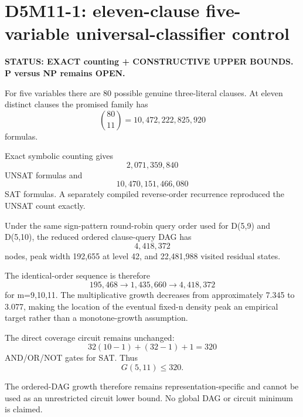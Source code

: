 \section*{D5M11-1: eleven-clause five-variable universal-classifier control}

\textbf{STATUS: EXACT counting + CONSTRUCTIVE UPPER BOUNDS. P versus NP remains OPEN.}

For five variables there are 80 possible genuine three-literal clauses. At
eleven distinct clauses the promised family has
\[
\binom{80}{11}=10{,}472{,}222{,}825{,}920
\]
formulas.

Exact symbolic counting gives
\[
\boxed{2{,}071{,}359{,}840}
\]
UNSAT formulas and
\[
10{,}470{,}151{,}466{,}080
\]
SAT formulas. A separately compiled reverse-order recurrence reproduced the
UNSAT count exactly.

Under the same sign-pattern round-robin query order used for D(5,9) and
D(5,10), the reduced ordered clause-query DAG has
\[
\boxed{4{,}418{,}372}
\]
nodes, peak width 192,655 at level 42, and 22,481,988 visited residual states.

The identical-order sequence is therefore
\[
195{,}468\to1{,}435{,}660\to4{,}418{,}372
\]
for m=9,10,11. The multiplicative growth decreases from approximately 7.345 to
3.077, making the location of the eventual fixed-n density peak an empirical
target rather than a monotone-growth assumption.

The direct coverage circuit remains unchanged:
\[
32(10-1)+(32-1)+1=320
\]
AND/OR/NOT gates for SAT. Thus
\[
G(5,11)\le320.
\]

The ordered-DAG growth therefore remains representation-specific and cannot be
used as an unrestricted circuit lower bound. No global DAG or circuit minimum
is claimed.

